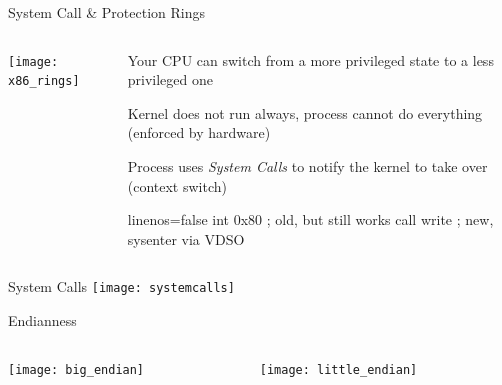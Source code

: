 \documentclass[beamer]{uibk}
\begin{document}
\begin{frame}[fragile]{System Call \& Protection Rings}
    \begin{columns}
        \begin{column}{0.55\textwidth}
            \texttt{[image: x86\_rings]}
        \end{column}
        \begin{column}{0.45\textwidth}
            Your CPU can switch from a more privileged state to a less
            privileged one
            \bigskip

            Kernel does not run always, process cannot do everything (enforced
            by hardware)
            \bigskip

            Process uses \emph{System Calls} to notify the kernel to take over
            (context switch)
            \medskip

            \begin{nasmcode*}{linenos=false}
                int   0x80   ; old, but still works
                call  write  ; new, sysenter via VDSO
            \end{nasmcode*}
        \end{column}
    \end{columns}
\end{frame}

\begin{frame}{System Calls}
    \texttt{[image: systemcalls]}
\end{frame}

\begin{frame}{Endianness}
    \begin{columns}
        \begin{column}{0.5\textwidth}
            \begin{center}
                \texttt{[image: big\_endian]}
            \end{center}
        \end{column}
        \begin{column}{0.5\textwidth}
            \begin{center}
                \texttt{[image: little\_endian]}
            \end{center}
        \end{column}
    \end{columns}
\end{frame}
\end{document}
